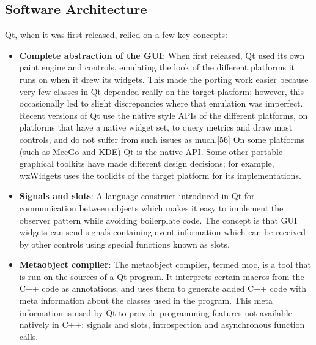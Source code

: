 \subsection{Software Architecture}
Qt, when it was first released, relied on a few key concepts:\\
\begin{itemize}
	\item \textbf{Complete abstraction of the GUI}: When first released, Qt used its own paint engine and controls, emulating the look of the different platforms it runs on when it drew its widgets. This made the porting work easier because very few classes in Qt depended really on the target platform; however, this occasionally led to slight discrepancies where that emulation was imperfect. Recent versions of Qt use the native style APIs of the different platforms, on platforms that have a native widget set, to query metrics and draw most controls, and do not suffer from such issues as much.[56] On some platforms (such as MeeGo and KDE) Qt is the native API. Some other portable graphical toolkits have made different design decisions; for example, wxWidgets uses the toolkits of the target platform for its implementations.
	\item \textbf{Signals and slots}: A language construct introduced in Qt for communication between objects which makes it easy to implement the observer pattern while avoiding boilerplate code. The concept is that GUI widgets can send signals containing event information which can be received by other controls using special functions known as slots.
	\item \textbf{Metaobject compiler}: The metaobject compiler, termed moc, is a tool that is run on the sources of a Qt program. It interprets certain macros from the C++ code as annotations, and uses them to generate added C++ code with meta information about the classes used in the program. This meta information is used by Qt to provide programming features not available natively in C++: signals and slots, introspection and asynchronous function calls.
\end{itemize}
